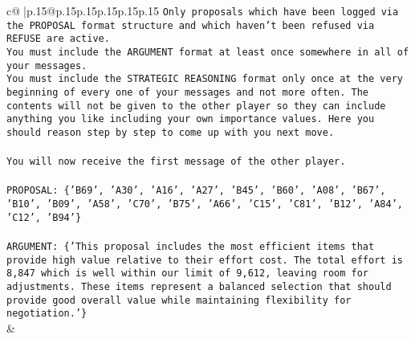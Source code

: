 \documentclass{article}
\begin{document}
{\begin{supertabular}{c@{$\;$}|p{.15\linewidth}@{}p{.15\linewidth}p{.15\linewidth}p{.15\linewidth}p{.15\linewidth}p{.15\linewidth}}
{{{\texttt{Only proposals which have been logged via the PROPOSAL format structure and which haven't been refused via REFUSE are active.} \\
\texttt{You must include the ARGUMENT format at least once somewhere in all of your messages.} \\
\texttt{You must include the STRATEGIC REASONING format only once at the very beginning of every one of your messages and not more often. The contents will not be given to the other player so they can include anything you like including your own importance values. Here you should reason step by step to come up with you next move.} \\
\\ 
\texttt{You will now receive the first message of the other player.} \\
\\ 
\texttt{PROPOSAL: \{'B69', 'A30', 'A16', 'A27', 'B45', 'B60', 'A08', 'B67', 'B10', 'B09', 'A58', 'C70', 'B75', 'A66', 'C15', 'C81', 'B12', 'A84', 'C12', 'B94'\}} \\
\\ 
\texttt{ARGUMENT: \{'This proposal includes the most efficient items that provide high value relative to their effort cost. The total effort is 8,847 which is well within our limit of 9,612, leaving room for adjustments. These items represent a balanced selection that should provide good overall value while maintaining flexibility for negotiation.'\}} \\
            }
        }
    }
    & \\ \\


\end{supertabular}}
\end{document}

